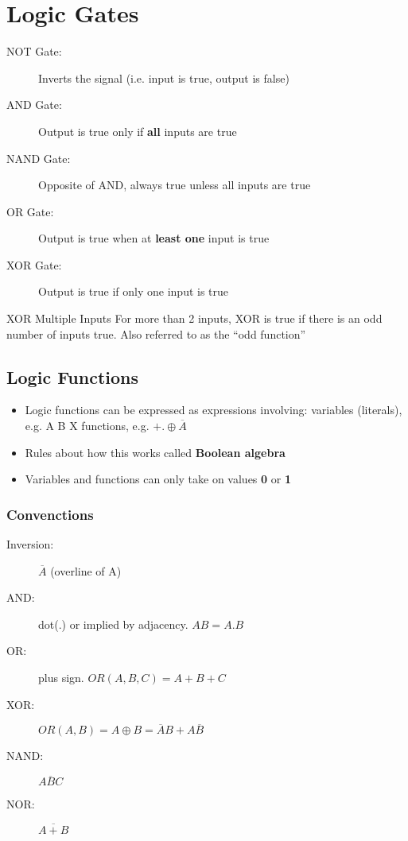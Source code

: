 \section{Logic Gates}
\begin{description}
	\item[NOT Gate:] Inverts the signal (i.e. input is true, output is false)
	\item[AND Gate:] Output is true only if \textbf{all} inputs are true
	\item[NAND Gate:] Opposite of AND, always true unless all inputs are true
	\item[OR Gate:] Output is true when at \textbf{least one} input is true
	\item[XOR Gate:] Output is true if only one input is true
\end{description}

\begin{note}{XOR Multiple Inputs}
	For more than 2 inputs, XOR is true if there is an odd number of inputs true. Also referred to as the ``odd function''	
\end{note}

\subsection{Logic Functions}
\begin{itemize}
	\item Logic functions can be expressed as expressions involving:
	\subitem variables (literals), e.g. A B X
	\subitem functions, e.g. $+ . \oplus \overline{A}$
	\item Rules about how this works called \textbf{Boolean algebra}
	\item Variables and functions can only take on values \textbf{0} or \textbf{1}
\end{itemize}

\subsubsection{Convenctions}
\begin{description}
	\item[Inversion:] $\overline{A}$ (overline of A)
	\item[AND:] dot(.) or implied by adjacency. $AB=A.B$
	\item[OR:] plus sign. $OR(A,B,C) = A+B+C$
	\item[XOR:] $OR(A, B) = A\oplus B=\overline{A}B+A\overline{B}$
	\item[NAND:] $\overline{ABC}$
	\item[NOR:] $\overline{A+B}$
\end{description}

